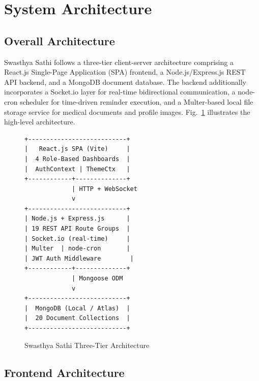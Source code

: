 
\section{System Architecture}

\subsection{Overall Architecture}

Swasthya Sathi follows a three-tier client-server architecture comprising a React.js Single-Page Application (SPA) frontend, a Node.js/Express.js REST API backend, and a MongoDB document database. The backend additionally incorporates a Socket.io layer for real-time bidirectional communication, a node-cron scheduler for time-driven reminder execution, and a Multer-based local file storage service for medical documents and profile images. Fig.~\ref{fig:arch} illustrates the high-level architecture.

\begin{figure}[h]
\centering
\begin{verbatim}
+---------------------------+
|   React.js SPA (Vite)     |
|  4 Role-Based Dashboards  |
|  AuthContext | ThemeCtx   |
+------------+--------------+
             | HTTP + WebSocket
             v
+---------------------------+
| Node.js + Express.js      |
| 19 REST API Route Groups  |
| Socket.io (real-time)     |
| Multer  | node-cron       |
| JWT Auth Middleware        |
+------------+--------------+
             | Mongoose ODM
             v
+---------------------------+
|  MongoDB (Local / Atlas)  |
|  20 Document Collections  |
+---------------------------+
\end{verbatim}
\caption{Swasthya Sathi Three-Tier Architecture}
\label{fig:arch}
\end{figure}

\subsection{Frontend Architecture}

